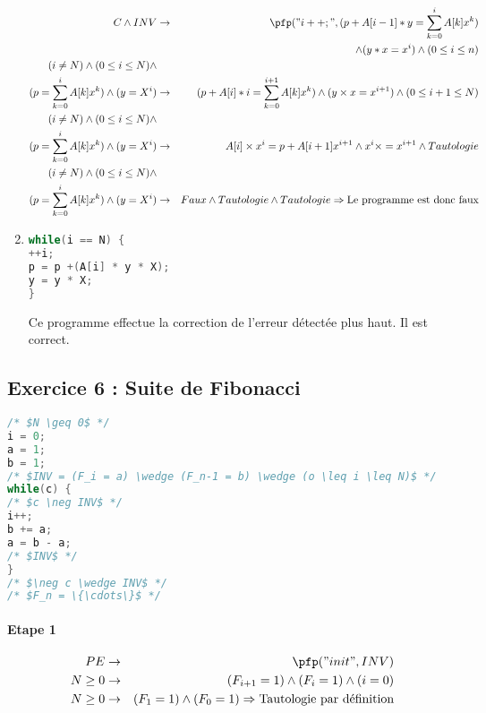 \begin{enumerate}
\begin{eqnarray*}
		C \wedge INV &\rightarrow& \pfp ("i++;", (p+A[i-1]*y = \sum^i_{k=0}A[k]x^k)\\&&\wedge(y*x=x^i)\wedge(0\leq i\leq n )\\
		(i \neq N) \wedge (0\leq i \leq N) \wedge\\ (p = \sum^i_{k=0} A[k] x^k) \wedge (y=X^i) &\rightarrow& (p+A[i] * i = \sum^{i+1}_{k=0}A[k]x^k) \wedge (y \times x = x^{i+1}) \wedge (0 \leq i+1 \leq N)\\
		(i \neq N) \wedge (0\leq i \leq N) \wedge \\(p = \sum^i_{k=0} A[k] x^k) \wedge (y=X^i) &\rightarrow& A[i] \times x^i = p+A[i+1]x^{i+1} \wedge x^i \times = x^{i+1} \wedge Tautologie \\
		(i \neq N) \wedge (0\leq i \leq N) \wedge \\(p = \sum^i_{k=0} A[k] x^k) \wedge (y=X^i) &\rightarrow& Faux \wedge Tautologie \wedge Tautologie\Rightarrow \textrm{Le programme est donc faux} \\
	\end{eqnarray*}
\item \begin{lstlisting}[language=C,numbers=none]
while(i == N) { 
++i;	
p = p +(A[i] * y * X); 
y = y * X; 
}
\end{lstlisting}
Ce programme effectue la correction de l'erreur détectée plus haut. Il est correct.
\end{enumerate}

\subsection{Exercice 6 : Suite de Fibonacci}

\begin{lstlisting}[language=C,numbers=none]
/* $N \geq 0$ */
i = 0; 
a = 1; 
b = 1;
/* $INV = (F_i = a) \wedge (F_n-1 = b) \wedge (o \leq i \leq N)$ */
while(c) {
/* $c \neg INV$ */
i++;
b += a;
a = b - a;
/* $INV$ */
}
/* $\neg c \wedge INV$ */
/* $F_n = \{\cdots\}$ */
\end{lstlisting}

\paragraph{Etape 1}
\begin{eqnarray*}
PE &\rightarrow& \pfp("init", INV)\\
N \geq 0 &\rightarrow& (F_{i+1} = 1) \wedge (F_i = 1) \wedge (i=0)\\
N \geq 0 &\rightarrow& (F_1 = 1) \wedge (F_0 = 1)\Rightarrow \textrm{Tautologie par définition}
\end{eqnarray*}
